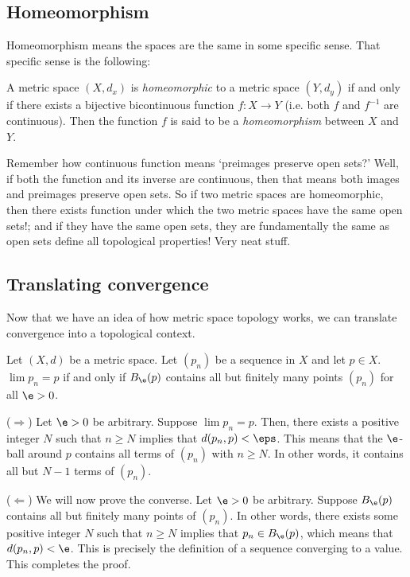 \documentclass[class=article, crop=false]{standalone}
\begin{document}
\subsection{Homeomorphism}

Homeomorphism means the spaces are the same in some specific sense. That specific sense is the following:
\begin{defn}[Homeomorphism]
    A metric space $(X,d_x)$ is \textit{homeomorphic} to a metric space $(Y,d_y)$ if and only if there exists a bijective bicontinuous function $f \colon X \to Y$ (i.e. both $f$ and $f^{-1}$ are continuous). Then the function $f$ is said to be a \textit{homeomorphism} between $X$ and $Y$.
\end{defn}
Remember how continuous function means `preimages preserve open sets?' Well, if both the function and its inverse are continuous, then that means both images and preimages preserve open sets. So if two metric spaces are homeomorphic, then there exists function under which the two metric spaces have the same open sets!; and if they have the same open sets, they are fundamentally the same as open sets define all topological properties! Very neat stuff.

\subsection{Translating convergence}

Now that we have an idea of how metric space topology works, we can translate convergence into a topological context.

\begin{thm}{\label{thm:topologicalconvergence}}
    Let $(X,d)$ be a metric space. Let $(p_n)$ be a sequence in $X$ and let $p \in X$. $\lim p_n = p$ if and only if $B_\e(p)$ contains all but finitely many points $(p_n)$ for all $\e > 0$.
\end{thm}
\begin{pf}
    ($\Rightarrow$) Let $\e > 0$ be arbitrary. Suppose $\lim p_n = p$. Then, there exists a positive integer $N$ such that $n \geq N$ implies that $d(p_n,p) < \eps$. This means that the $\e$-ball around $p$ contains all terms of $(p_n)$ with $n \geq N$. In other words, it contains all but $N-1$ terms of $(p_n)$.

    ($\Leftarrow$) We will now prove the converse. Let $\e > 0$ be arbitrary. Suppose $B_\e(p)$ contains all but finitely many points of $(p_n)$. In other words, there exists some positive integer $N$ such that $n \geq N$ implies that $p_n \in B_\e(p)$, which means that $d(p_n,p) < \e$. This is precisely the definition of a sequence converging to a value. This completes the proof.
\end{pf}
\end{document}
